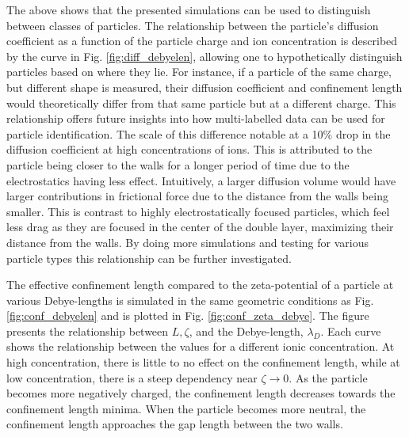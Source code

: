 The above shows that the presented simulations can be used to distinguish between classes of particles. The relationship between the particle's diffusion coefficient as a function of the particle charge and ion concentration is described by the curve in Fig. \ref{fig:diff_debyelen}, allowing one to hypothetically distinguish particles based on where they lie. For instance, if a particle of the same charge, but different shape is measured, their diffusion coefficient and confinement length would theoretically differ from that same particle but at a different charge. This relationship offers future insights into how multi-labelled data can be used for particle identification. The scale of this difference notable at a 10\% drop in the diffusion coefficient at high concentrations of ions. This is attributed to the particle being closer to the walls for a longer period of time due to the electrostatics having less effect. Intuitively, a larger diffusion volume would have larger contributions in frictional force due to the distance from the walls being smaller. This is contrast to  highly electrostatically focused particles, which feel less drag as they are focused in the center of the double layer, maximizing their distance from the walls. By doing more simulations and testing for various particle types this relationship can be further investigated. 

The effective confinement length compared to the zeta-potential of a particle at various Debye-lengths is simulated in the same geometric conditions as Fig. \ref{fig:conf_debyelen} and is plotted in Fig. \ref{fig:conf_zeta_debye}. The figure presents the relationship between $L, \zeta$, and the Debye-length, $\lambda_D$. Each curve shows the relationship between the values for a different ionic concentration. At high concentration, there is little to no effect on the confinement length, while at low concentration, there is a steep dependency near $\zeta \rightarrow 0$. As the particle becomes more negatively charged, the confinement length decreases towards the confinement length minima. When the particle becomes more neutral, the confinement length approaches the gap length between the two walls. 

